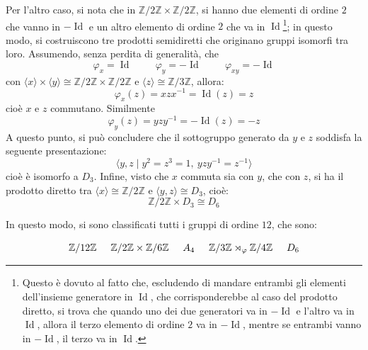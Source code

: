 \documentclass[12pt]{scrartcl}
\theoremstyle{style}
\newenvironment{boxenv}[1][]{
    \begin{eqbox}[#1]
    }{
   \end{eqbox}
}
\numberwithin{equation}{subsection}
\begin{document}
\begin{itemize}
		Per l'altro caso, si nota che in $\mathbb{Z}/2\mathbb{Z}\times \mathbb{Z}/2\mathbb{Z}$, si hanno due elementi di ordine $2$ che vanno in $-\operatorname{Id} $ e un altro elemento di ordine $2$ che va in $\operatorname{Id} $\footnote{Questo \`e dovuto al fatto che, escludendo di mandare entrambi gli elementi dell'insieme generatore in $\operatorname{Id} $, che corrisponderebbe al caso del prodotto diretto, si trova che quando uno dei due generatori va in $-\operatorname{Id} $ e l'altro va in $\operatorname{Id} $, allora il terzo elemento di ordine $2$ va in $-\operatorname{Id} $, mentre se entrambi vanno in $-\operatorname{Id} $, il terzo va in $\operatorname{Id} $.}; in questo modo, si costruiscono tre prodotti semidiretti che originano gruppi isomorfi tra loro.
Assumendo, senza perdita di generalit\`a, che 
\[
\varphi _x = \operatorname{Id} \hspace{1cm} \varphi _y = -\operatorname{Id} \hspace{1cm} \varphi _{xy} = - \operatorname{Id} 
\] 
con $\langle x \rangle\times \langle y \rangle\cong \mathbb{Z}/2\mathbb{Z}\times \mathbb{Z}/2\mathbb{Z}$ e $\langle z \rangle\cong \mathbb{Z}/3\mathbb{Z}$, allora:
\[
\varphi _x (z) = x z x^{-1} = \operatorname{Id} (z) = z 
\] 
cio\`e $x $ e $z$ commutano.
Similmente
\[
\varphi _y (z) =yzy^{-1} =- \operatorname{Id} (z) = - z
\] 
A questo punto, si pu\`o concludere che il sottogruppo generato da $y $ e $z$ soddisfa la seguente presentazione:
\[
\langle y,z  \mid y^2 = z^3 = 1 , \ yzy^{-1} = z^{-1}\rangle
\] 
cio\`e \`e isomorfo a $D_3$.
Infine, visto che $x$ commuta sia con $y$, che con $z$, si ha il prodotto diretto tra $\langle x \rangle \cong \mathbb{Z}/2\mathbb{Z}$ e $\langle y,z \rangle\cong D_3$, cio\`e:
\[
\mathbb{Z}/2\mathbb{Z}\times D_3 \cong D_6
\] 
\end{itemize}
In questo modo, si sono classificati tutti i gruppi di ordine $12$, che sono:
\begin{boxenv}[]
\[
\mathbb{Z}/12\mathbb{Z} \hspace{.5cm} \mathbb{Z}/2\mathbb{Z} \times \mathbb{Z}/6\mathbb{Z} \hspace{.5cm} A_4 \hspace{.5cm} \mathbb{Z}/3\mathbb{Z} \rtimes _\varphi \mathbb{Z}/4\mathbb{Z} \hspace{.5cm} D_6
\] 
\end{boxenv}
\end{document}
